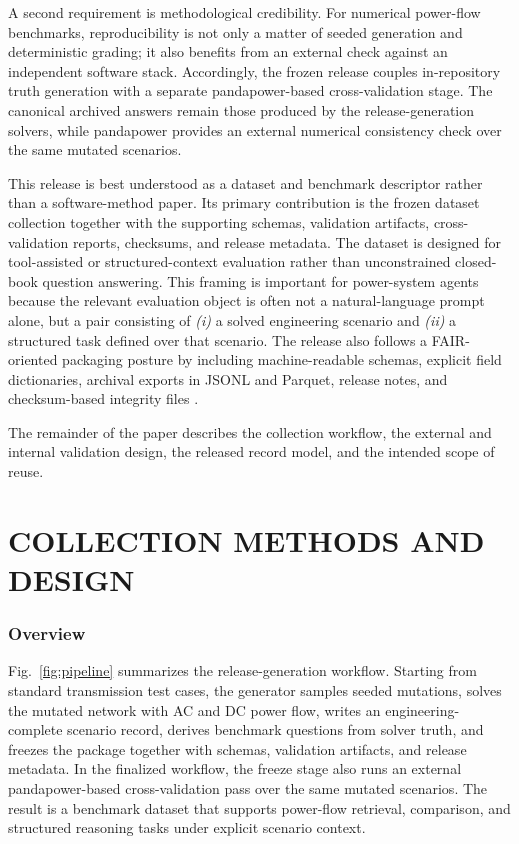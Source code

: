 A second requirement is methodological credibility. For numerical power-flow benchmarks, reproducibility is not only a matter of seeded generation and deterministic grading; it also benefits from an external check against an independent software stack. Accordingly, the frozen release couples in-repository truth generation with a separate pandapower-based cross-validation stage. The canonical archived answers remain those produced by the release-generation solvers, while pandapower provides an external numerical consistency check over the same mutated scenarios.

This release is best understood as a dataset and benchmark descriptor rather than a software-method paper. Its primary contribution is the frozen dataset collection together with the supporting schemas, validation artifacts, cross-validation reports, checksums, and release metadata. The dataset is designed for tool-assisted or structured-context evaluation rather than unconstrained closed-book question answering. This framing is important for power-system agents because the relevant evaluation object is often not a natural-language prompt alone, but a pair consisting of \emph{(i)} a solved engineering scenario and \emph{(ii)} a structured task defined over that scenario. The release also follows a FAIR-oriented packaging posture by including machine-readable schemas, explicit field dictionaries, archival exports in JSONL and Parquet, release notes, and checksum-based integrity files \cite{wilkinson2016fair}.

The remainder of the paper describes the collection workflow, the external and internal validation design, the released record model, and the intended scope of reuse.

\section*{COLLECTION METHODS AND DESIGN}

\subsubsection*{Overview}

Fig.~\ref{fig:pipeline} summarizes the release-generation workflow. Starting from standard transmission test cases, the generator samples seeded mutations, solves the mutated network with AC and DC power flow, writes an engineering-complete scenario record, derives benchmark questions from solver truth, and freezes the package together with schemas, validation artifacts, and release metadata. In the finalized workflow, the freeze stage also runs an external pandapower-based cross-validation pass over the same mutated scenarios. The result is a benchmark dataset that supports power-flow retrieval, comparison, and structured reasoning tasks under explicit scenario context.

